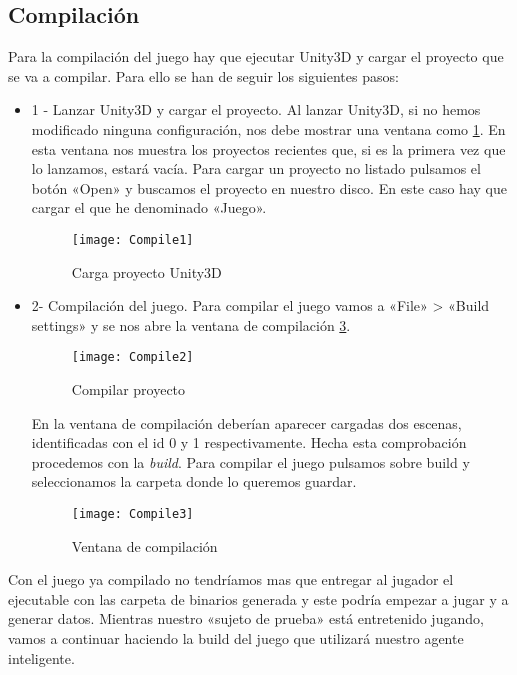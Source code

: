 \subsection{Compilación}
Para la compilación del juego hay que ejecutar Unity3D y cargar el proyecto que se va a compilar. Para ello se han de seguir los siguientes pasos:
\begin{itemize}
    \item 1 - Lanzar Unity3D y cargar el proyecto. Al lanzar Unity3D, si no hemos modificado ninguna configuración, nos debe mostrar una ventana como \ref{fig:compile1}. En esta ventana nos muestra los proyectos recientes que, si es la primera vez que lo lanzamos, estará vacía. Para cargar un proyecto no listado pulsamos el botón «Open» y buscamos el proyecto en nuestro disco. En este caso hay que cargar el que he denominado «Juego».
        \begin{figure}[h!]
        \centering
        \texttt{[image: Compile1]}
        \caption{Carga proyecto Unity3D}
        \label{fig:compile1}
        \end{figure}
\item 2- Compilación del juego. Para compilar el juego vamos a «File» > «Build settings» y se nos abre la ventana de compilación \ref{fig:compile3}.
        \begin{figure}[h!]
        \centering
        \texttt{[image: Compile2]}
        \caption{Compilar proyecto}
        \label{fig:compile2}
        \end{figure}
En la ventana de compilación deberían aparecer cargadas dos escenas, identificadas con el id 0 y 1 respectivamente. Hecha esta comprobación procedemos con la \emph{build}. Para compilar el juego pulsamos sobre build y seleccionamos la carpeta donde lo queremos guardar.
        \begin{figure}[h!]
        \centering
        \texttt{[image: Compile3]}
        \caption{Ventana de compilación}
        \label{fig:compile3}
        \end{figure}
\end{itemize}

Con el juego ya compilado no tendríamos mas que entregar al jugador el ejecutable con las carpeta de binarios generada y este podría empezar a jugar y a generar datos. Mientras nuestro «sujeto de prueba» está entretenido jugando, vamos a continuar haciendo la build del juego que utilizará nuestro agente inteligente.




